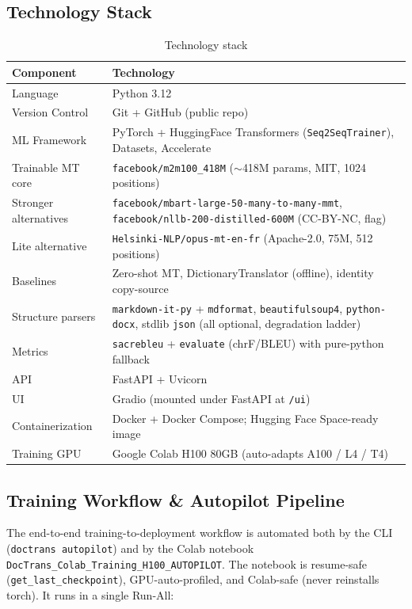 \documentclass[12pt,a4paper]{article}
\begin{document}
\subsection{Technology Stack}

\begin{table}[H]
\centering
\caption{Technology stack}
\small
\begin{tabularx}{\linewidth}{@{} l L @{}}
\toprule
\textbf{Component} & \textbf{Technology} \\
\midrule
Language & Python 3.12 \\
Version Control & Git + GitHub (public repo) \\
ML Framework & PyTorch + HuggingFace Transformers (\texttt{Seq2SeqTrainer}), Datasets, Accelerate \\
Trainable MT core & \texttt{facebook/m2m100\_418M} ($\sim$418M params, MIT, 1024 positions) \\
Stronger alternatives & \texttt{facebook/mbart-large-50-many-to-many-mmt}, \texttt{facebook/nllb-200-distilled-600M} (CC-BY-NC, flag) \\
Lite alternative & \texttt{Helsinki-NLP/opus-mt-en-fr} (Apache-2.0, 75M, 512 positions) \\
Baselines & Zero-shot MT, DictionaryTranslator (offline), identity copy-source \\
Structure parsers & \texttt{markdown-it-py} + \texttt{mdformat}, \texttt{beautifulsoup4}, \texttt{python-docx}, stdlib \texttt{json} (all optional, degradation ladder) \\
Metrics & \texttt{sacrebleu} + \texttt{evaluate} (chrF/BLEU) with pure-python fallback \\
API & FastAPI + Uvicorn \\
UI & Gradio (mounted under FastAPI at \texttt{/ui}) \\
Containerization & Docker + Docker Compose; Hugging Face Space-ready image \\
Training GPU & Google Colab H100 80GB (auto-adapts A100 / L4 / T4) \\
\bottomrule
\end{tabularx}
\end{table}

\subsection{Training Workflow \& Autopilot Pipeline}
\label{subsec:workflow}

The end-to-end training-to-deployment workflow is automated both by the CLI (\texttt{doctrans autopilot}) and by the Colab notebook \texttt{DocTrans\_Colab\_Training\_H100\_AUTOPILOT}. The notebook is resume-safe (\texttt{get\_last\_checkpoint}), GPU-auto-profiled, and Colab-safe (never reinstalls torch). It runs in a single Run-All:
\end{document}
